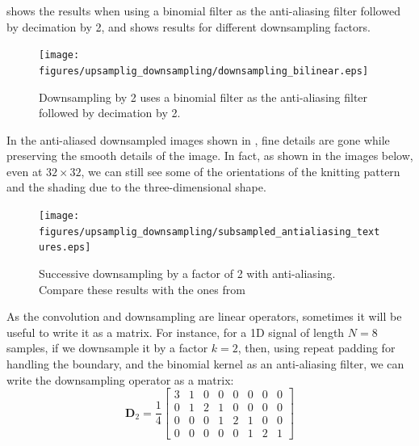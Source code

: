 \Fig{\ref{fig:downsampling_bilinear}} shows the results when using a binomial filter as the anti-aliasing filter followed by decimation by 2, and \fig{\ref{fig:subsampled_antialiasing_textures}} shows results for different downsampling factors. 



\begin{figure}[t]
\centerline{
\texttt{[image: figures/upsamplig\_downsampling/downsampling\_bilinear.eps]}
}
\caption{Downsampling by 2 uses a binomial filter as the anti-aliasing filter followed by decimation by 2.}
\label{fig:downsampling_bilinear}
\end{figure}

In the anti-aliased downsampled images shown in \fig{\ref{fig:subsampled_antialiasing_textures}}, fine details are gone while preserving the smooth details of the image. In fact, as shown in the images below, even at $32 \times 32$, we can still see some of the orientations of the knitting pattern and the shading due to the three-dimensional shape.

\begin{figure}[t]
\centerline{
\texttt{[image: figures/upsamplig\_downsampling/subsampled\_antialiasing\_textures.eps]}
}
\caption{Successive downsampling by a factor of 2 with anti-aliasing. Compare these results with the ones from \fig{\ref{fig:subsampled_textures}}}
\label{fig:subsampled_antialiasing_textures}
\end{figure}


As the convolution and downsampling are linear operators, sometimes it will be useful to write it as a matrix. For instance, for a 1D signal of length $N=8$  samples, if we downsample it by a factor $k=2$, then, using repeat padding for handling the boundary, and the binomial kernel as an anti-aliasing filter, we can write the downsampling operator as a matrix:
\begin{equation}
\mathbf{D}_2 = \frac{1}{4} \left[ 
\begin{array}{cccccccc}
3 & 1 & 0 & 0 & 0 & 0 & 0 & 0 \\
0 & 1 & 2 & 1 & 0 & 0 & 0 & 0 \\
0 & 0 & 0 & 1 & 2 & 1 & 0 & 0 \\
0 & 0 & 0 & 0 & 0 & 1 & 2 & 1  
\end{array}
\right]
\end{equation}

